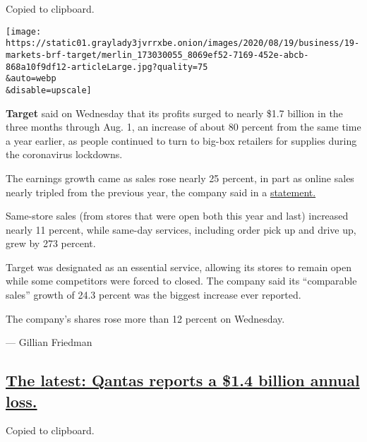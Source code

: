 Copied to clipboard.

\texttt{[image: https://static01.graylady3jvrrxbe.onion/images/2020/08/19/business/19-markets-brf-target/merlin\_173030055\_8069ef52-7169-452e-abcb-868a10f9df12-articleLarge.jpg?quality=75\\\&auto=webp\\\&disable=upscale]}

\textbf{Target} said on Wednesday that its profits surged to nearly
\$1.7 billion in the three months through Aug. 1, an increase of about
80 percent from the same time a year earlier, as people continued to
turn to big-box retailers for supplies during the coronavirus lockdowns.

The earnings growth came as sales rose nearly 25 percent, in part as
online sales nearly tripled from the previous year, the company said in
a
\href{https://investors.target.com/news-releases/news-release-details/target-corporation-reports-second-quarter-earnings}{statement.}

Same-store sales (from stores that were open both this year and last)
increased nearly 11 percent, while same-day services, including order
pick up and drive up, grew by 273 percent.

Target was designated as an essential service, allowing its stores to
remain open while some competitors were forced to closed. The company
said its ``comparable sales'' growth of 24.3 percent was the biggest
increase ever reported.

The company's shares rose more than 12 percent on Wednesday.

--- Gillian Friedman

\hypertarget{the-latest-qantas-reports-a-14-billion-annual-loss}{%
\subsection{\texorpdfstring{\protect\hyperlink{the-latest-qantas-reports-a-1-4-billion-annual-loss}{The
latest: Qantas reports a \$1.4 billion annual
loss.}}{The latest: Qantas reports a \$1.4 billion annual loss.}}\label{the-latest-qantas-reports-a-14-billion-annual-loss}}

Copied to clipboard.

